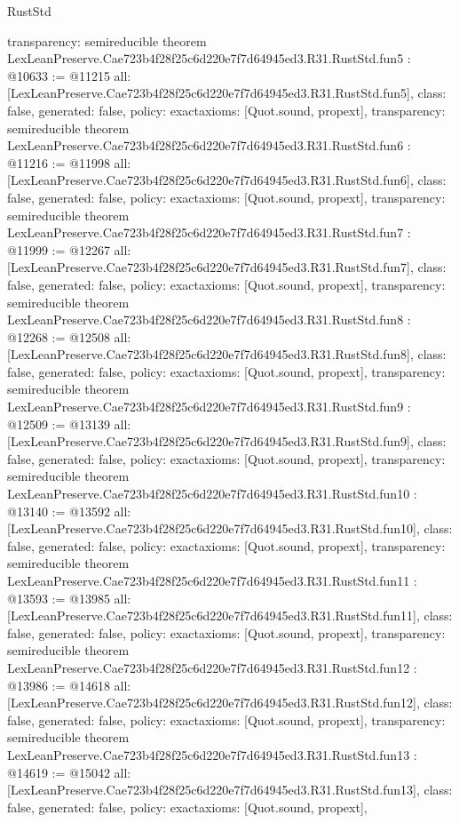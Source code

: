\begin{lexlean}{RustStd}
\begin{coremodule}
{  transparency: semireducible
}
theorem LexLeanPreserve.Cae723b4f28f25c6d220e7f7d64945ed3.R31.RustStd.fun5 : @10633 := @11215 {
  all: [LexLeanPreserve.Cae723b4f28f25c6d220e7f7d64945ed3.R31.RustStd.fun5],
  class: false,
  generated: false,
  policy: exact{axioms: [Quot.sound, propext]},
  transparency: semireducible
}
theorem LexLeanPreserve.Cae723b4f28f25c6d220e7f7d64945ed3.R31.RustStd.fun6 : @11216 := @11998 {
  all: [LexLeanPreserve.Cae723b4f28f25c6d220e7f7d64945ed3.R31.RustStd.fun6],
  class: false,
  generated: false,
  policy: exact{axioms: [Quot.sound, propext]},
  transparency: semireducible
}
theorem LexLeanPreserve.Cae723b4f28f25c6d220e7f7d64945ed3.R31.RustStd.fun7 : @11999 := @12267 {
  all: [LexLeanPreserve.Cae723b4f28f25c6d220e7f7d64945ed3.R31.RustStd.fun7],
  class: false,
  generated: false,
  policy: exact{axioms: [Quot.sound, propext]},
  transparency: semireducible
}
theorem LexLeanPreserve.Cae723b4f28f25c6d220e7f7d64945ed3.R31.RustStd.fun8 : @12268 := @12508 {
  all: [LexLeanPreserve.Cae723b4f28f25c6d220e7f7d64945ed3.R31.RustStd.fun8],
  class: false,
  generated: false,
  policy: exact{axioms: [Quot.sound, propext]},
  transparency: semireducible
}
theorem LexLeanPreserve.Cae723b4f28f25c6d220e7f7d64945ed3.R31.RustStd.fun9 : @12509 := @13139 {
  all: [LexLeanPreserve.Cae723b4f28f25c6d220e7f7d64945ed3.R31.RustStd.fun9],
  class: false,
  generated: false,
  policy: exact{axioms: [Quot.sound, propext]},
  transparency: semireducible
}
theorem LexLeanPreserve.Cae723b4f28f25c6d220e7f7d64945ed3.R31.RustStd.fun10 : @13140 := @13592 {
  all: [LexLeanPreserve.Cae723b4f28f25c6d220e7f7d64945ed3.R31.RustStd.fun10],
  class: false,
  generated: false,
  policy: exact{axioms: [Quot.sound, propext]},
  transparency: semireducible
}
theorem LexLeanPreserve.Cae723b4f28f25c6d220e7f7d64945ed3.R31.RustStd.fun11 : @13593 := @13985 {
  all: [LexLeanPreserve.Cae723b4f28f25c6d220e7f7d64945ed3.R31.RustStd.fun11],
  class: false,
  generated: false,
  policy: exact{axioms: [Quot.sound, propext]},
  transparency: semireducible
}
theorem LexLeanPreserve.Cae723b4f28f25c6d220e7f7d64945ed3.R31.RustStd.fun12 : @13986 := @14618 {
  all: [LexLeanPreserve.Cae723b4f28f25c6d220e7f7d64945ed3.R31.RustStd.fun12],
  class: false,
  generated: false,
  policy: exact{axioms: [Quot.sound, propext]},
  transparency: semireducible
}
theorem LexLeanPreserve.Cae723b4f28f25c6d220e7f7d64945ed3.R31.RustStd.fun13 : @14619 := @15042 {
  all: [LexLeanPreserve.Cae723b4f28f25c6d220e7f7d64945ed3.R31.RustStd.fun13],
  class: false,
  generated: false,
  policy: exact{axioms: [Quot.sound, propext]},
}
\end{coremodule}
\end{lexlean}
